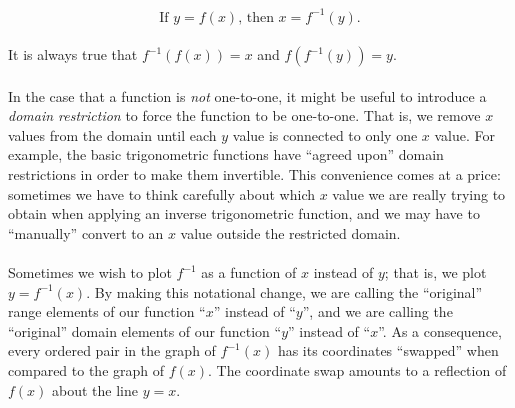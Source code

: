 \documentclass[10.5pt,twoside]{report}
\theoremstyle{definition}
\begin{document}
$$\text{If } y=f(x)\text{, then }x=f^{-1}(y).$$
${}$\\
It is always true that $f^{-1}(f(x))=x$ and $f(f^{-1}(y))=y$.\\
${}$\\

In the case that a function is \textit{not} one-to-one, it might be useful to introduce a \textit{domain restriction} to force the function to be one-to-one.  That is, we remove $x$ values from the domain until each $y$ value is connected to only one $x$ value.  For example, the basic trigonometric functions have ``agreed upon'' domain restrictions in order to make them invertible.  This convenience comes at a price:  sometimes we have to think carefully about which $x$ value we are really trying to obtain when applying an inverse trigonometric function, and we may have to ``manually'' convert to an $x$ value outside the restricted domain.\\
${}$\\
Sometimes we wish to plot $f^{-1}$ as a function of $x$ instead of $y$; that is, we plot $y=f^{-1}(x)$.  By making this notational change, we are calling the ``original'' range elements of our function ``$x$'' instead of ``$y$'', and we are calling the ``original'' domain elements of our function ``$y$'' instead of ``$x$''.  As a consequence, every ordered pair in the graph of $f^{-1}(x)$ has its coordinates ``swapped'' when compared to the graph of $f(x)$.  The coordinate swap amounts to a reflection of $f(x)$ about the line $y=x$.  

${}$\\
\end{document}
